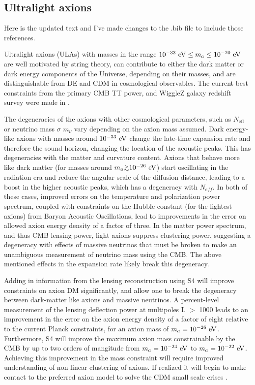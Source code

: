 \subsection{Ultralight axions}

Here is the updated text and I've made changes to the .bib file to include those references.

Ultralight axions (ULAs) with masses in the range $10^{-33}~{\rm eV}\leq m_{a}\leq 10^{-20}~{\rm eV}$ are well motivated by string theory, can contribute to either the dark matter or dark energy components of the Universe, depending on their masses, and are distinguishable from DE and CDM in cosmological observables. The current best constraints from the primary CMB TT power, and WiggleZ galaxy redshift survey were made in \cite{hlozek:2015axa}.

The degeneracies of the axions with other cosmological parameters, such as $N_\mathrm{eff}$ or neutrino mass $\sigma$ $m_\nu$ vary depending on the axion mass assumed. Dark energy-like axions with masses around $10^{-33}~{\rm eV}$ change the late-time expansion rate and therefore the sound horizon, changing the location of the acoustic peaks. This has degeneracies with the matter and curvature content.
 Axions that behave more like dark matter (for masses around $m_a \gtrsim 10^{-26}~{\rm eV}$) start oscillating in the radiation era and reduce the angular scale of the diffusion distance, leading to a boost in the higher acoustic peaks, which has a degeneracy with $N_{eff}$.
 In both of these cases, improved errors on the temperature and polarization power spectrum, coupled with constraints on the Hubble constant (for the lightest axions) from Baryon Acoustic Oscillations, lead to improvements in the error on allowed axion energy density of a factor of three.
In the matter power spectrum, and thus CMB lensing power, light axions suppress clustering power, suggesting a degeneracy with effects of massive neutrinos that must be broken to make an unambiguous measurement of neutrino mass using the CMB. The above mentioned effects in the expansion rate likely break this degeneracy.
 
 Adding in information from the lensing reconstruction using S4 will improve constraints on axion DM significantly, and allow one to break the degeneracy between dark-matter like axions and massive neutrinos. A percent-level measurement of the lensing deflection power at multipoles L $>$ 1000 leads to an improvement in the error on the axion energy density of a factor of eight relative to the current Planck constraints, for an axion mass of $m_a=10^{-26}~{\rm eV}$. Furthermore, S4 will improve the maximum axion mass constrainable by the CMB by up to two orders of mangitude from $m_a=10^{-24}~{\rm eV}$ to $m_a=10^{-22}~{\rm eV}$. Achieving this improvement in the mass constraint will require improved understanding of non-linear clustering of axions. If realized it will begin to make contact to the preferred axion model to solve the CDM small scale crises \cite{hu:00a, marsh:2013js}.



%



